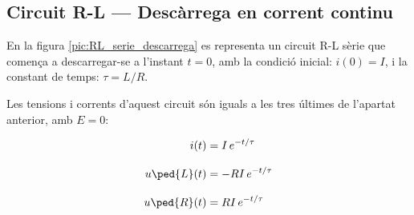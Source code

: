 \subsection{Circuit R-L --- Descàrrega en corrent continu}\label{sec:RL-descarrega}

En la figura \vref{pic:RL_serie_descarrega} es representa un circuit R-L sèrie que comença a descarregar-se a l'instant $t=0$, amb la condició inicial: $i(0) = I$, i la constant de temps: $\tau = L/R$.
\begin{center}
    
    \label{pic:RL_serie_descarrega}
\end{center}


Les tensions i corrents d'aquest circuit són iguals a les tres últimes de l'apartat anterior, amb $E=0$:

\hfill
\begin{minipage}[b]{9cm}
    
\end{minipage}
\hfill
\begin{minipage}[b]{6cm}
    \begin{align}
        i(t) &= I\,e^{-t/\tau} \label{eq:RL-i-descarrega}\\[3mm]
        u\ped{L}(t) &= - R I\,e^{-t/\tau}\label{eq:RL-ul-descarrega} \\[3mm]
        u\ped{R}(t) &= R I\,e^{-t/\tau}
    \end{align}
\end{minipage}



